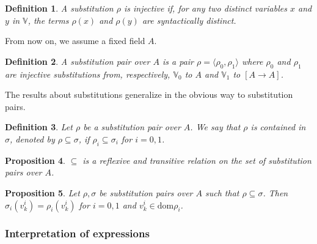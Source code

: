 \documentclass{article}
\newtheorem{definition}{Definition}[section]
\newtheorem{proposition}[definition]{Proposition}
\newcommand{\V}{{\mathbb V}}
\newcommand{\dom}{\ensuremath{\mathrm{dom}}}
\begin{document}
\begin{definition} A substitution $\rho$ is \emph{injective} if, for any
two distinct variables $x$ and $y$ in $\V$, the terms $\rho(x)$
and $\rho(y)$ are syntactically distinct.
\end{definition}

\bigskip From now on, we assume a fixed field $A$.

\begin{definition}\label{substpair} A \emph{substitution pair over $A$}
is a pair $\rho=\langle\rho_0,\rho_1\rangle$ where $\rho_0$ and
$\rho_1$ are injective substitutions from, respectively, $\V_0$ to $A$
and $\V_1$ to $[A\to A]$.
\end{definition}

The results about substitutions generalize in the obvious way to
substitution pairs.

\begin{definition}\label{substpair:incl}
Let $\rho$ be a substitution pair over $A$.  We say that $\rho$
\emph{is contained} in $\sigma$, denoted by $\rho\subseteq\sigma$, if
$\rho_i\subseteq\sigma_i$ for $i=0,1$.
\end{definition}

\begin{proposition}\label{substpair:incl:props}
$\subseteq$ is a reflexive and transitive relation on the set of substitution
pairs over $A$.
\end{proposition}

\begin{proposition}\label{substpair:incl:wdef}
Let $\rho,\sigma$ be substitution pairs over $A$ such that
$\rho\subseteq\sigma$.  Then $\sigma_i(v^i_k)=\rho_i(v^i_k)$ for $i=0,1$
and $v^i_k\in\dom\rho_i$.
\end{proposition}

\subsubsection*{Interpretation of expressions}
\end{document}
